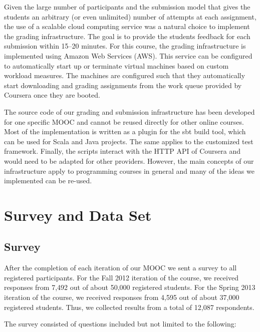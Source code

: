 \documentclass{sig-alternate}
\begin{document}
Given the large number of participants and the submission model that gives the
students an arbitrary (or even unlimited) number of attempts at each assignment, the use of a scalable
cloud computing service was a natural choice to implement the grading infrastructure.
The goal is to provide the students feedback for each submission within 15--20
minutes. For this course, the grading infrastructure is implemented using Amazon
Web Services (AWS). This service can be configured to automatically start up or
terminate virtual machines based on custom workload measures. The machines are
configured such that they automatically start downloading and grading assignments
from the work queue provided by Coursera once they are booted.

The source code of our grading and submission infrastructure has been developed
for one specific MOOC and cannot be reused directly for other online courses.
Most of the implementation is written as a plugin for the sbt build tool, which
can be used for Scala and Java projects. The same applies to the customized test
framework. Finally, the scripts interact with the HTTP API of Coursera and would
need to be adapted for other providers. However, the main concepts of our
infrastructure apply to programming courses in general and many of the ideas
we implemented can be re-used.




\section{Survey and Data Set}
\label{sec:survey-data-set}

\subsection{Survey}

After the completion of each iteration of our MOOC we sent a survey to all
registered participants. For the Fall 2012 iteration of the course, we
received responses from 7,492 out of about 50,000 registered students. For the
Spring 2013 iteration of the course, we received responses from 4,595 out of
about 37,000 registered students. Thus, we collected results from a total of
12,087 respondents.

The survey consisted of questions included but not limited to the following:
\end{document}
